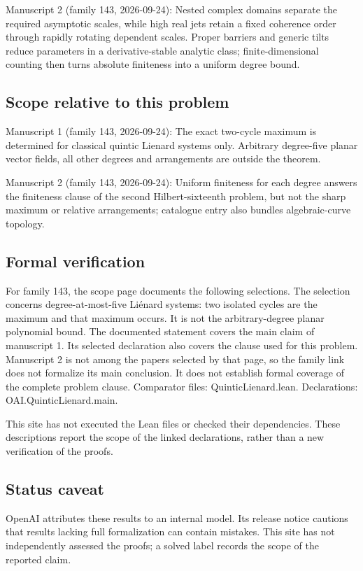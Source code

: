\documentclass[11pt]{article}
\begin{document}
Manuscript 2 (family 143, 2026-09-24): Nested complex domains separate the required asymptotic scales, while high real jets retain a fixed coherence order through rapidly rotating dependent scales. Proper barriers and generic tilts reduce parameters in a derivative-stable analytic class; finite-dimensional counting then turns absolute finiteness into a uniform degree bound.

\subsection{Scope relative to this problem}
Manuscript 1 (family 143, 2026-09-24): The exact two-cycle maximum is determined for classical quintic Lienard systems only. Arbitrary degree-five planar vector fields, all other degrees and arrangements are outside the theorem.

Manuscript 2 (family 143, 2026-09-24): Uniform finiteness for each degree answers the finiteness clause of the second Hilbert-sixteenth problem, but not the sharp maximum or relative arrangements; catalogue entry also bundles algebraic-curve topology.

\subsection{Formal verification}
For family 143, the scope page documents the following selections. The selection concerns degree-at-most-five Liénard systems: two isolated cycles are the maximum and that maximum occurs. It is not the arbitrary-degree planar polynomial bound. The documented statement covers the main claim of manuscript 1. Its selected declaration also covers the clause used for this problem. Manuscript 2 is not among the papers selected by that page, so the family link does not formalize its main conclusion. It does not establish formal coverage of the complete problem clause. Comparator files: QuinticLienard.lean. Declarations: OAI.QuinticLienard.main.

This site has not executed the Lean files or checked their dependencies. These descriptions report the scope of the linked declarations, rather than a new verification of the proofs.

\subsection{Status caveat}
OpenAI attributes these results to an internal model. Its release notice cautions that results lacking full formalization can contain mistakes. This site has not independently assessed the proofs; a solved label records the scope of the reported claim.
\end{document}
